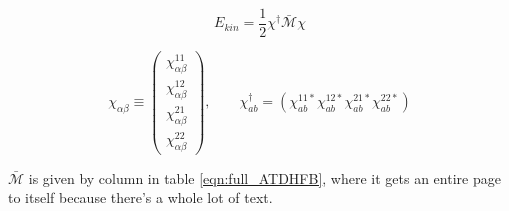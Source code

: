 \begin{equation}\label{eqn:kinetic_energy}
E_{kin} = \frac{1}{2}\chi^\dagger\mathcal{\bar{M}}\chi
\end{equation}


\begin{equation*}
\chi_{\alpha\beta} \equiv \left(\begin{array}{c}
\chi_{\alpha\beta}^{11}\\
\chi_{\alpha\beta}^{12}\\
\chi_{\alpha\beta}^{21}\\
\chi_{\alpha\beta}^{22}
\end{array}\right), \qquad
\chi^\dagger_{ab} = \left(
\chi_{ab}^{11*} 
\chi_{ab}^{12*} 
\chi_{ab}^{21*} 
\chi_{ab}^{22*} 
\right)
\end{equation*}

$\mathcal{\bar{M}}$ is given by column in table \ref{eqn:full_ATDHFB}, where it gets an entire page to itself because there's a whole lot of text.

